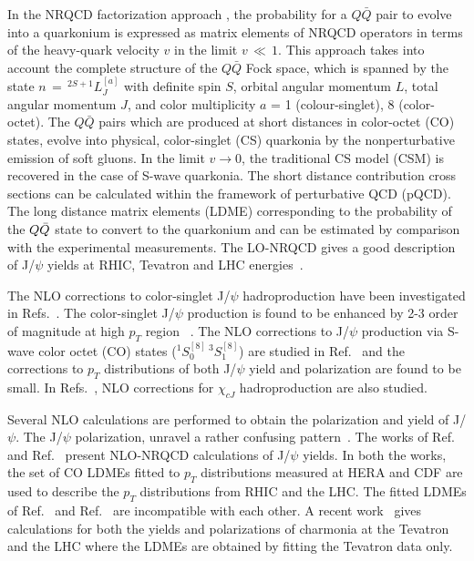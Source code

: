 \documentclass[aps,prc,preprint,superscriptaddress,showpacs,showkeys,amsmath]{revtex4-1}
\begin{document}
  In the NRQCD factorization approach \cite{Bodwin:1994jh},
the probability for a $Q\bar Q$ pair to evolve into a quarkonium is expressed
as matrix elements of NRQCD operators in terms of the heavy-quark velocity 
$v$ in the limit $v\,\ll\,1$. This approach takes into account the complete structure of 
the $Q\bar Q$ Fock space, which is spanned by the state $n\,=\,^{2S+1}L_{J}^{[a]}$ 
with definite spin $S$, orbital angular momentum $L$, total angular momentum $J$, 
and color multiplicity $a$ = 1 (colour-singlet), 8 (color-octet). 
 The $Q\bar Q$ pairs which are produced at short distances in color-octet (CO) states, 
evolve into physical, color-singlet (CS) quarkonia by the nonperturbative 
emission of soft gluons. 
In the limit $v\rightarrow0$, the traditional CS model (CSM) is recovered in 
the case of S-wave quarkonia.
 The short distance contribution cross sections can be calculated within the 
framework of perturbative QCD (pQCD). The long distance matrix elements (LDME) 
corresponding to the probability of the $Q{\bar{Q}}$ state to convert to the quarkonium 
and can be estimated by comparison with the experimental measurements. 
  The LO-NRQCD gives a good description of J/$\psi$ yields at RHIC, Tevatron and 
LHC energies~\cite{Sharma:2012dy}.

 The NLO corrections to color-singlet J/$\psi$ hadroproduction have been investigated 
in Refs.~\cite{Campbell:2007ws,Gong:2008sn}. The color-singlet J/$\psi$ 
production is found to be enhanced by 2-3 order of magnitude at high 
$p_T$ region ~\cite{Gong:2008sn}.
 The NLO corrections to J/$\psi$ production via S-wave 
color octet (CO) states ($^1S_{0}^{[8]}\,^3S_{1}^{[8]}$) are studied in 
Ref.~\cite{Gong:2008ft} and the corrections to $p_{T}$ distributions of both 
J/$\psi$ yield and polarization are found to be small. In Refs.~\cite{Ma:2010vd}, 
NLO corrections for $\chi_{cJ}$ hadroproduction are also studied. 

  Several NLO calculations are performed to obtain the polarization and yield of
J/$\psi$. The J/$\psi$ polarization, unravel a rather confusing 
pattern~\cite{Butenschoen:2012px,Chao:2012iv,Gong:2012ug}.
  The works of Ref.~\cite{Butenschoen:2010rq} and  Ref.~\cite{Ma:2010jj} present
NLO-NRQCD calculations of J/$\psi$ yields.
  In both the works, the set of CO LDMEs fitted to $p_{T}$ distributions measured 
at HERA and CDF are used to describe the $p_{T}$ distributions from RHIC and 
the LHC.
 The fitted LDMEs of Ref.~\cite{Butenschoen:2010rq} and  Ref.~\cite{Ma:2010jj}
are incompatible with each other. A recent work~\cite{Shao:2014yta} gives 
calculations for both the yields and polarizations of charmonia at the Tevatron 
and the LHC where the LDMEs are obtained by fitting the Tevatron data only.
\end{document}
